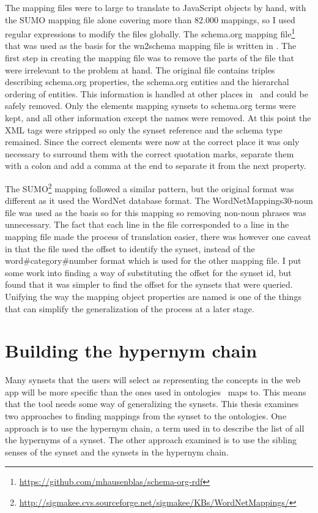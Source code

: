 The mapping files were to large to translate to JavaScript objects by hand, with the SUMO mapping file alone
covering more than 82.000 mappings, so I used regular expressions to modify the files globally.
The schema.org mapping file\footnote{\url{https://github.com/mhausenblas/schema-org-rdf}}
that was used as the basis for the wn2schema mapping file is written in .
The first step in creating the mapping file was to remove the parts of the file that were irrelevant to the problem at hand.
The original file contains triples describing schema.org properties,
the schema.org entities and the hierarchal ordering of entities.
This information is handled at other places in \theartefact\ and could be safely removed.
Only the elements mapping synsets to schema.org terms were kept, and all other information except the names were removed.
At this point the XML tags were stripped so only the synset reference and the schema type remained.
Since the correct elements were now at the correct place it was only necessary to surround them with the correct quotation
marks, separate them with a colon and add a comma at the end to separate it from the next property.

The SUMO\footnote{\url{http://sigmakee.cvs.sourceforge.net/sigmakee/KBs/WordNetMappings/}} mapping followed a similar pattern,
but the original format was different as it used the WordNet database format.
The WordNetMappings30-noun file was used as the basis so for this mapping so removing non-noun phrases was unnecessary.
The fact that each line in the file corresponded to a line in the mapping file made the process of translation easier,
there was however one caveat in that the file used the offset to identify the synset,
instead of the word\#category\#number format which is used for the other mapping file.
I put some work into finding a way of substituting the offset for the synset id,
but found that it was simpler to find the offset for the synsets that were queried.
Unifying the way the mapping object properties are named is one of the things that can simplify
the generalization of the process at a later stage.



\section{Building the hypernym chain}
\label{BuildingTheHypernymChain}
Many synsets that the users will select as representing the concepts in the web app will be more specific than
the ones used in ontologies \theartefact\ maps to.
This means that the tool needs some way of generalizing the synsets.
This thesis examines two approaches to finding mappings from the synset to the ontologies.
One approach is to use the hypernym chain,
a term used in \citet{Veres2011} to describe the list of all the hypernyms of a synset.
The other approach examined is to use the sibling senses of the synset and the synsets in the hypernym chain.

